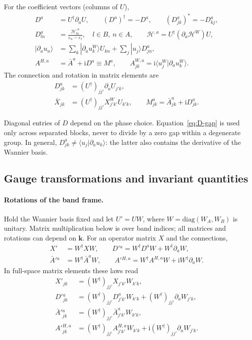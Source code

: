 \documentclass[prx,amsmath,amssymb,superscriptaddress,longbibliography]{revtex4-2}
\newcommand{\ii}{\mathrm{i}}
\begin{document}
For the coefficient vectors (columns of $U$),
\begin{align}
 D^a&=U^\dagger\partial_a U,\qquad
 (D^a)^\dagger=-D^a,\qquad (D_{jk}^a)^*=-D_{kj}^a,
 \label{eq:D}\\
 D_{ln}^a&=\frac{\mathcal H_{ln}^{,a}}{\varepsilon_n-\varepsilon_l},
 \quad l\in B,\ n\in A,\qquad
 \mathcal H^{,a}=U^\dagger(\partial_a\mathcal H^W)U,
 \label{eq:D-gap}\\
 |\partial_a u_n\rangle
 &=\sum_k|\partial_a u_k^W\rangle U_{kn}+\sum_j|u_j\rangle D_{jn}^a,
 \\
 A^{H,a}&=\bar A^a+\ii D^a\equiv M^a,\qquad
 A_{jk}^{W,a}=\ii\langle u_j^W|\partial_a u_k^W\rangle.
 \label{eq:M}
\end{align}
The connection and rotation in matrix elements are
\begin{align}
 D_{jk}^a&=(U^\dagger)_{jj'}\partial_aU_{j'k},\nonumber\\
 \bar X_{jk}&=(U^\dagger)_{jj'}X_{j'k'}^WU_{k'k},\qquad
 M_{jk}^a=\bar A_{jk}^a+\ii D_{jk}^a.
 \label{eq:connection-components}
\end{align}

Diagonal entries of $D$ depend on the phase choice.
Equation~\eqref{eq:D-gap} is used only across separated blocks, never to divide
by a zero gap within a degenerate group.
In general, $D_{jk}^a\ne\langle u_j|\partial_a u_k\rangle$:
the latter also contains the derivative of the Wannier basis.

\subsection{Gauge transformations and invariant quantities}
\label{sec:gauge-transformations}
\paragraph{Rotations of the band frame.}
Hold the Wannier basis fixed and let $U'=UW$, where
$W=\mathrm{diag}(W_A,W_B)$ is unitary. Matrix multiplication below is over
band indices; all matrices and rotations can depend on $\bm k$.
For an operator matrix $X$ and the connections,
\begin{align}
 X'&=W^\dagger XW,\qquad
 D'{}^a=W^\dagger D^aW+W^\dagger\partial_aW,
 \label{eq:band-gauge-D}\\
 \bar A'{}^a&=W^\dagger\bar A^aW,\qquad
 A'{}^{H,a}=W^\dagger A^{H,a}W+\ii W^\dagger\partial_aW.
 \label{eq:band-gauge-A}
\end{align}
In full-space matrix elements these laws read
\begin{align}
 X'_{jk}&=(W^\dagger)_{jj'}X_{j'k'}W_{k'k},\nonumber\\
 D'{}_{jk}^a&=(W^\dagger)_{jj'}D_{j'k'}^aW_{k'k}
 +(W^\dagger)_{jj'}\partial_aW_{j'k},\nonumber\\
 \bar A'{}_{jk}^a&=(W^\dagger)_{jj'}\bar A_{j'k'}^aW_{k'k},\nonumber\\
 A'{}_{jk}^{H,a}&=(W^\dagger)_{jj'}A_{j'k'}^{H,a}W_{k'k}
 +\ii (W^\dagger)_{jj'}\partial_aW_{j'k}.
 \label{eq:band-gauge-components}
\end{align}
\end{document}
